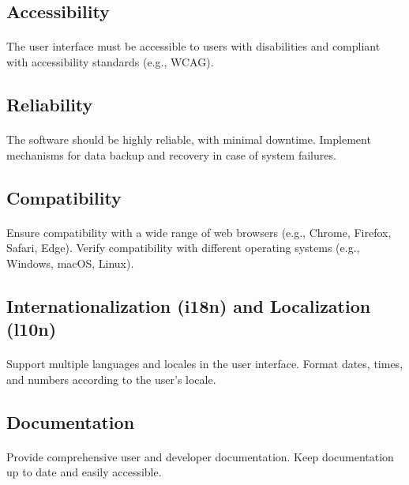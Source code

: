 \documentclass{article}
\begin{document}
\subsection{Accessibility}
\paragraph{}
The user interface must be accessible to users with disabilities and compliant with accessibility standards (e.g., WCAG).

\subsection{Reliability}
\paragraph{}
The software should be highly reliable, with minimal downtime.
Implement mechanisms for data backup and recovery in case of system failures.

\subsection{Compatibility}
\paragraph{}
Ensure compatibility with a wide range of web browsers (e.g., Chrome, Firefox, Safari, Edge).
Verify compatibility with different operating systems (e.g., Windows, macOS, Linux).

\subsection{Internationalization (i18n) and Localization (l10n)}
\paragraph{}
Support multiple languages and locales in the user interface.
Format dates, times, and numbers according to the user's locale.

\subsection{Documentation}
\paragraph{}
Provide comprehensive user and developer documentation.
Keep documentation up to date and easily accessible.
\end{document}
